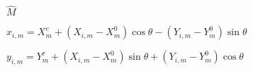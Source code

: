 \documentclass{article}
\begin{document}
$ \hat{M} $
\pagebreak

$ x_{i,m} = X^c_m + (X_{i,m} - X^0_m) \cos\theta - (Y_{i,m} - Y^0_m) \sin\theta $
\pagebreak

$ y_{i,m} = Y^c_m + (X_{i,m} - X^0_m) \sin\theta + (Y_{i,m} - Y^0_m) \cos\theta $
\pagebreak
\end{document}
